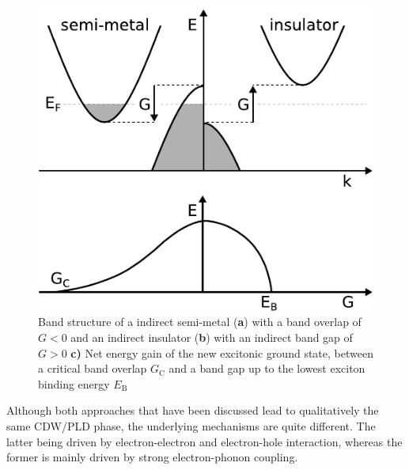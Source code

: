 \begin{figure}[!t]
	\begin{minipage}{0.5\columnwidth}
		\includegraphics[width=\columnwidth]{figs/excitonic_insulator.pdf}
	\end{minipage}
	\hspace{0.04\columnwidth}
	\begin{minipage}{0.45\columnwidth}
		\caption{Band structure of a indirect semi-metal (\textbf{a}) with a band overlap of $G<0$ and an indirect insulator (\textbf{b}) with an indirect band gap of $G>0$ \textbf{c)} Net energy gain of the new excitonic ground state, between a critical band overlap $G_\mathrm{C}$ and a band gap up to the lowest exciton binding energy $E_\mathrm{B}$}
		\label{fig:ei}
	\end{minipage}
\end{figure}

Although both approaches that have been discussed lead to qualitatively the same \ac{CDW}/\ac{PLD} phase, the underlying mechanisms are quite different.
The latter being driven by electron-electron and electron-hole interaction, whereas the former is mainly driven by strong electron-phonon coupling.


